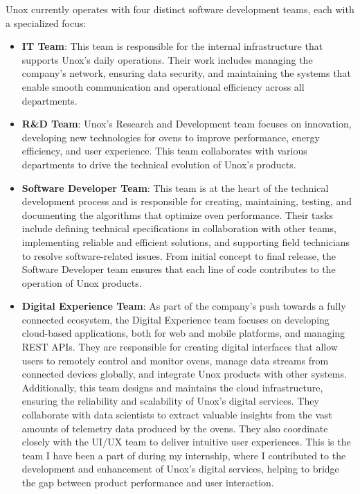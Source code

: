 Unox currently operates with four distinct software development teams, each with a specialized focus:
\begin{itemize}
    \item \textbf{IT Team}: This team is responsible for the internal infrastructure that supports Unox's daily operations. Their work includes managing the company's network, ensuring data security, and maintaining the systems that enable smooth communication and operational efficiency across all departments.

    \item \textbf{R\&D Team}: Unox's Research and Development team focuses on innovation, developing new technologies for ovens to improve performance, energy efficiency, and user experience. This team collaborates with various departments to drive the technical evolution of Unox's products.

    \item \textbf{Software Developer Team}: This team is at the heart of the technical development process and is responsible for creating, maintaining, testing, and documenting the algorithms that optimize oven performance. Their tasks include defining technical specifications in collaboration with other teams, implementing reliable and efficient solutions, and supporting field technicians to resolve software-related issues. From initial concept to final release, the Software Developer team ensures that each line of code contributes to the operation of Unox products.

    \item \textbf{Digital Experience Team}: As part of the company's push towards a fully connected ecosystem, the Digital Experience team focuses on developing cloud-based applications, both for web and mobile platforms, and managing REST APIs. They are responsible for creating digital interfaces that allow users to remotely control and monitor ovens, manage data streams from connected devices globally, and integrate Unox products with other systems. Additionally, this team designs and maintains the cloud infrastructure, ensuring the reliability and scalability of Unox's digital services. They collaborate with data scientists to extract valuable insights from the vast amounts of telemetry data produced by the ovens. They also coordinate closely with the UI/UX team to deliver intuitive user experiences.
    This is the team I have been a part of during my internship, where I contributed to the development and enhancement of Unox's digital services, helping to bridge the gap between product performance and user interaction.
\end{itemize}

